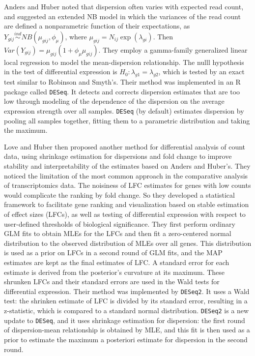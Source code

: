 Anders and Huber \citep{anders2010differential} noted that dispersion often varies with expected read count, and suggested an extended NB model in which the variances of the read count are defined a nonparametric function of their expectations, as $Y_{gij} \stackrel{ind}{\sim} NB(\mu_{gij}, \phi_\mu)$, where $\mu_{gij}=N_{ij}\exp(\lambda_{gi})$. Then $Var(Y_{gij}) = \mu_{gij}(1+\phi_\mu \mu_{gij})$. They employ a gamma-family generalized linear local regression to model the mean-dispersion relationship. The nulll hypothesis in the test of differential expression is $H_0: \lambda_{g1} = \lambda_{g2}$, which is tested by an exact test similar to Robinson and Smyth's. Their method was implemented in an R package called {\tt DESeq}. It detects and corrects dispersion estimates that are too low through modeling of the dependence of the dispersion on the average expression strength over all samples. {\tt DESeq} (by default) estimates dispersion by pooling all samples together, fitting them to a parametric distribution and taking the maximum.

Love and Huber \citep{love2014moderated} then proposed another method for differential analysis of count data, using shrinkage estimation for dispersions and fold change to improve stability and interpretability of the estimates based on Anders and Huber's. They noticed the limitation of the most common approach in the comparative analysis of transcriptomics data. The noisiness of LFC estimates for genes with low counts would complicate the ranking by fold change. So they developed a statistical framework to facilitate gene ranking and visualization based on stable estimation of effect sizes (LFCs), as well as testing of differential expression with respect to user-defined thresholds of biological significance. They first perform ordinary GLM fits to obtain MLEs for the LFCs and then fit a zero-centered normal distribution to the observed distribution of MLEs over all genes. This distribution is used as a prior on LFCs in a second round of GLM fits, and the MAP estimates are kept as the final estimates of LFC. A standard error for each estimate is derived from the posterior's curvature at its maximum. These shrunken LFCs and their standard errors are used in the Wald tests for differential expression. Their method was implemented by {\tt DESeq2}. It uses a Wald test: the shrinken estimate of LFC is divided by its standard error, resulting in a z-statistic, which is compared to a standard normal distribution. {\tt DESeq2} is a new update to {\tt DESeq}, and it uses shrinkage estimation for dispersion: the first round of dispersion-mean relationship is obtained by MLE, and this fit is then used as a prior to estimate the maximum a posteriori estimate for dispersion in the second round. 


